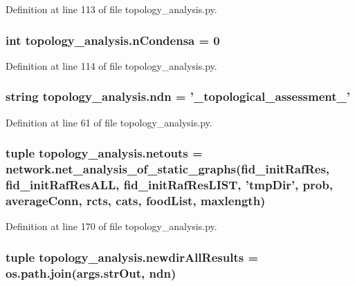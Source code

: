Definition at line 113 of file topology\+\_\+analysis.\+py.

\hypertarget{a00159_a38aa665f11207bbd8cd2da4c382d4aca}{
\subsubsection[{n\+Condensa}]{\setlength{\rightskip}{0pt plus 5cm}int topology\+\_\+analysis.\+n\+Condensa = 0}}\label{a00159_a38aa665f11207bbd8cd2da4c382d4aca}


Definition at line 114 of file topology\+\_\+analysis.\+py.

\hypertarget{a00159_aa6d4ad4089dc05372dcdfe03c969b8b4}{
\subsubsection[{ndn}]{\setlength{\rightskip}{0pt plus 5cm}string topology\+\_\+analysis.\+ndn = '\+\_\+topological\+\_\+assessment\+\_\+'}}\label{a00159_aa6d4ad4089dc05372dcdfe03c969b8b4}


Definition at line 61 of file topology\+\_\+analysis.\+py.

\hypertarget{a00159_af42f57da8ba80463f419efaf0f6f2c33}{
\subsubsection[{netouts}]{\setlength{\rightskip}{0pt plus 5cm}tuple topology\+\_\+analysis.\+netouts = network.\+net\+\_\+analysis\+\_\+of\+\_\+static\+\_\+graphs({\bf fid\+\_\+init\+Raf\+Res}, {\bf fid\+\_\+init\+Raf\+Res\+A\+L\+L}, {\bf fid\+\_\+init\+Raf\+Res\+L\+I\+S\+T}, 'tmp\+Dir', {\bf prob}, {\bf average\+Conn}, rcts, cats, {\bf food\+List}, maxlength)}}\label{a00159_af42f57da8ba80463f419efaf0f6f2c33}


Definition at line 170 of file topology\+\_\+analysis.\+py.

\hypertarget{a00159_a8e1c34cb190151a28fd81e19d6252253}{
\subsubsection[{newdir\+All\+Results}]{\setlength{\rightskip}{0pt plus 5cm}tuple topology\+\_\+analysis.\+newdir\+All\+Results = os.\+path.\+join(args.\+str\+Out, {\bf ndn})}}\label{a00159_a8e1c34cb190151a28fd81e19d6252253}


